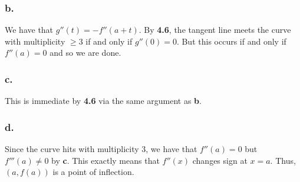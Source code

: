 \documentclass[letterpaper]{article}
\begin{document}
\subsubsection*{b.}

We have that $g''(t) = -f''(a + t)$.
By \textbf{4.6}, the tangent line meets the curve with multiplicity $\geq 3$ if and only if $g''(0) = 0$.
But this occurs if and only if $f''(a) = 0$ and so we are done.

\subsubsection*{c.}

This is immediate by \textbf{4.6} via the same argument as \textbf{b}.

\subsubsection*{d.}

Since the curve hits with multiplicity $3$, we have that $f''(a) = 0$ but $f'''(a) \neq 0$ by \textbf{c}.
This exactly means that $f''(x)$ changes sign at $x = a$.
Thus, $(a, f(a))$ is a point of inflection.


\printbibliography
\end{document}
